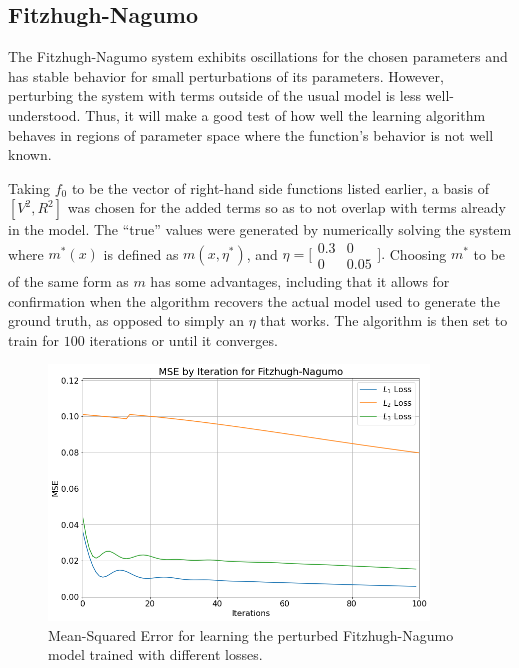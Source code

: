 \documentclass[12pt]{article}
\begin{document}
\subsection{Fitzhugh-Nagumo}

The Fitzhugh-Nagumo system exhibits oscillations for the chosen parameters and has stable behavior for small perturbations of its parameters.\cite{ramsay} However, perturbing the system with terms outside of the usual model is less well-understood. Thus, it will make a good test of how well the learning algorithm behaves in regions of parameter space where the function's behavior is not well known.

Taking $f_0$ to be the vector of right-hand side functions listed earlier, a basis of $[V^2, R^2]$ was chosen for the added terms so as to not overlap with terms already in the model. The ``true'' values were generated by numerically solving the system where $m^*(x)$ is defined as $m(x,\eta^*)$, and
$\eta = \big[\begin{smallmatrix}
  0.3 & 0\\
  0   & 0.05
  \end{smallmatrix}\big].$
Choosing $m^*$ to be of the same form as $m$ has some advantages, including that it allows for confirmation when the algorithm recovers the actual model used to generate the ground truth, as opposed to simply an $\eta$ that works. The algorithm is then set to train for $100$ iterations or until it converges.


\begin{figure}[ht]
  \centering
  \includegraphics[width=0.9\textwidth]{mse-fn.png}
  \caption{Mean-Squared Error for learning the perturbed Fitzhugh-Nagumo model trained with different losses.}
\end{figure}
\end{document}
